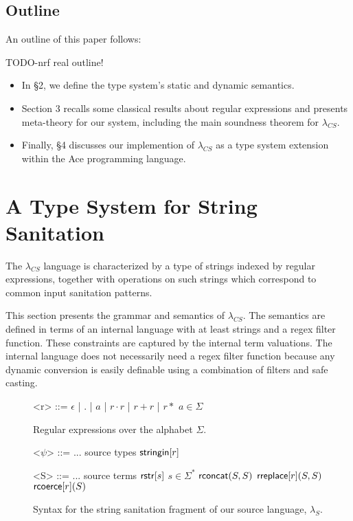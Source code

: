 \documentclass[10pt,preprint]{sigplanconf}
\theoremstyle{definition}
\newcommand{\lambdas}{\lambda_S}
\newcommand{\sisubst}[3]{{\sf rreplace}[#1](#2,#3)}
\newcommand{\coerce}[2]{ {\sf rcoerce}[#1](#2)}
\newcommand{\sistr}[1]{{\sf rstr}[#1]}
\newcommand{\strin}[1]{\sistr{#1}}
\newcommand{\rsconcat}[2]{{\sf rconcat}(#1,#2)}
\newcommand{\stringin}[1]{{\sf stringin}[#1]}
\newcommand{\lcs}{\lambda_{CS}}
\begin{document}
\subsection{Outline}

An outline of this paper follows:

TODO-nrf real outline!
\begin{itemize}
  \item In \S 2, we define the type system's static and dynamic semantics.
  \item Section 3 recalls some classical results about regular expressions and presents meta-theory for our system, including
    the main soundness theorem for $\lcs$.
  \item Finally, \S 4 discusses our implemention of $\lcs$ as a type system extension  within the Ace programming language.
\end{itemize}

\section{A Type System for String Sanitation}

The $\lcs$ language is characterized by a type of strings indexed by regular
expressions, together with operations on such strings which correspond to common
input sanitation patterns.

This section presents the grammar and semantics of $\lcs$.
The semantics are defined in terms of an internal language with at least strings and a regex filter function.
These constraints are captured by the internal term valuations.
The internal language does not necessarily need a regex filter function because
any dynamic conversion is easily definable using a combination of filters and safe
casting.
%
%

\renewcommand{\grammarlabel}[2]{#1\hfill#2}

\begin{figure}
\begin{grammar}
<r> ::= $\epsilon$ | $.$ | $a$ | $r \cdot r$ | $r + r$ | $r*$ \hfill $a \in \Sigma$

\caption{Regular expressions over the alphabet $\Sigma$.}
\end{grammar}
\end{figure}

\begin{figure}
\begin{grammar}

<$\psi$> ::=	...			\hfill	source types					\alt
$\stringin{r}$				 

<S> ::= ... \hfill source terms \alt
      $\strin{s}$ \hfill $s \in \Sigma^{*}$ \alt
      $\rsconcat{S}{S}$ \alt
      $\sisubst{r}{S}{S}$ \alt
      $\coerce{r}{S}$
\caption{Syntax for the string sanitation fragment of our source language, $\lambdas$.}
\end{grammar}
\end{figure}
\end{document}
